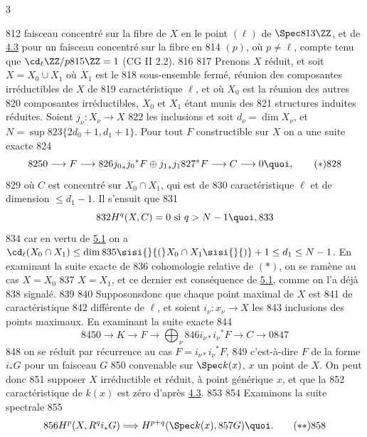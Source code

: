 3	\documentclass[10pt]{../fichiers-configuration-latex/smfart}
\begin{document}
   812	faisceau concentré sur la fibre de $X$ en le point $(\ell)$ de $\Spec
   813	\ZZ$, et de \hyperref[X.cor4.3]{4.3} pour un faisceau concentré sur la fibre en
   814	$(p)$, où $p\neq \ell$, compte tenu que $\cd_{\ell}\ZZ/p
   815	\ZZ=1$ (CG II 2.2).
   816	
   817	Prenons $X$ réduit, et soit $X=X_{0}\cup X_1$ où $X_1$ est le
   818	sous-ensemble fermé, réunion des composantes irréductibles de $X$ de
   819	caractéristique $\ell$, et où $X_{0}$ est la réunion des autres
   820	composantes irréductibles, $X_{0}$ et $X_1$ étant munis des
   821	structures induites réduites. Soient $j_{\nu}:X_{\nu}\rightarrow X$
   822	les inclusions et soit $d_{\nu}=\dim X_{\nu}$, et $N=\sup
   823	\{2d_{0}+1, d_1+1\}$. Pour tout $F$ constructible sur $X$ on a une suite exacte
   824	\begin{equation*}
   825	0\longrightarrow F\longrightarrow
   826	{j_{0}}_{\ast} j_{0}{}^{\ast}F\oplus {j_1}_{\ast} j_1
   827	{}^{\ast}F\longrightarrow C\longrightarrow 0{\quoi},\tag{$\ast$}
   828	\end{equation*}
   829	où $C$ est concentré sur $X_{0}\cap X_1$, qui est de
   830	caractéristique $\ell$ et de dimension $\leq d_1-1$. Il s'ensuit que
   831	$$
   832	H^q(X,C)=0\mbox{ si } q>N-1{\quoi},
   833	$$
   834	car en vertu de \hyperref[X.thm5.1]{5.1} on a $\cd_{\ell}(X_{0}\cap X_1)\leq \dim
   835	\sisi{}{(}X_{0}\cap X_1\sisi{}{)}+1\leq d_1\leq N-1$. En examinant la suite exacte de
   836	cohomologie relative de $(\ast)$, on se ramène au cas $X=X_{0}$ 
   837	$X=X_1$, et ce dernier est conséquence de \hyperref[X.thm5.1]{5.1}, comme on l'a déjà
   838	signalé.
   839	
   840	Supposons\pageoriginale donc que chaque point maximal de $X$ est 
   841	de caractéristique
   842	différente de $\ell$, et soient $i_{\nu}:x_{\nu}\rightarrow X$ les
   843	inclusions des points maximaux. En examinant la suite exacte
   844	$$
   845	0\longrightarrow K\longrightarrow F\longrightarrow \bigoplus_{\nu}
   846	i_{\nu\ast}i_{\nu}{}^{\ast}F\longrightarrow C\longrightarrow 0
   847	$$
   848	on se réduit par récurrence au cas $F=i_{\nu\ast}i_{\nu}{}^{\ast}F$,
   849	c'est-à-dire $F$ de la forme $i_{\ast}G$ pour un faisceau $G$
   850	convenable sur $\Spec k(x)$, $x$ un point de $X$. On peut donc
   851	supposer $X$ irréductible et réduit, à point générique $x$, et que la
   852	caractéristique de $k(x)$ est zéro d'après \hyperref[X.cor4.3]{4.3}.
   853	
   854	Examinons la suite spectrale
   855	\begin{equation*}
   856	H^p(X,R^qi_{\ast}G)\Longrightarrow H^{p+q}(\Spec k(x),
   857	G){\quoi}.\tag{${\ast}{\ast}$} 
   858	\end{equation*}
\end{document}
